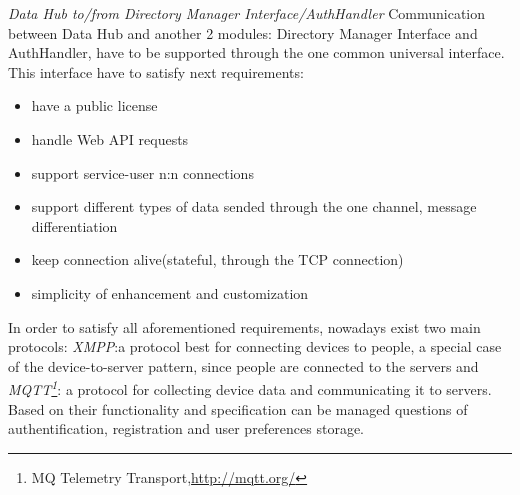       \emph{Data Hub to/from Directory Manager Interface/AuthHandler}
      Communication between Data Hub and another 2 modules: Directory Manager Interface and AuthHandler, have to be supported through the one common universal interface. This interface have to satisfy next requirements:
      \begin{itemize}
      \item have a public license
      \item handle Web API requests
      \item support service-user n:n connections
      \item support different types of data sended through the one channel, message differentiation
      \item keep connection alive(stateful, through the TCP connection)
      \item simplicity of enhancement and customization
      \end{itemize}

      In order to satisfy all aforementioned requirements, nowadays exist two main protocols: \emph{XMPP\cite{XMPPbook}}:a protocol best for connecting devices to people, a special case of the device-to-server pattern, since people are connected to the servers and \emph{MQTT\footnote{MQ Telemetry Transport,\url{http://mqtt.org/}}}: a protocol for collecting device data and communicating it to servers. Based on their functionality and specification can be managed questions of authentification, registration and user preferences storage.

